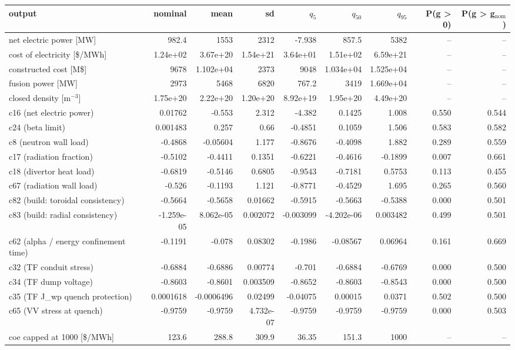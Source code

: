 \begin{tabular}{lrrrrrrrr}
\toprule
output & nominal & mean & sd & $q_{5}$ & $q_{50}$ & $q_{95}$ & P(g > 0) & P(g > g$_\mathrm{nom}$) \\
\midrule
net electric power [MW] & 982.4 & 1553 & 2312 & -7.938 & 857.5 & 5382 & -- & -- \\
cost of electricity [\$/MWh] & 1.24e+02 & 3.67e+20 & 1.54e+21 & 3.64e+01 & 1.51e+02 & 6.59e+21 & -- & -- \\
constructed cost [M\$] & 9678 & 1.102e+04 & 2373 & 9048 & 1.034e+04 & 1.525e+04 & -- & -- \\
fusion power [MW] & 2973 & 5468 & 6820 & 767.2 & 3419 & 1.669e+04 & -- & -- \\
closed density [m$^{-3}$] & 1.75e+20 & 2.22e+20 & 1.20e+20 & 8.92e+19 & 1.95e+20 & 4.49e+20 & -- & -- \\
c16 (net electric power) & 0.01762 & -0.553 & 2.312 & -4.382 & 0.1425 & 1.008 & 0.550 & 0.544 \\
c24 (beta limit) & 0.001483 & 0.257 & 0.66 & -0.4851 & 0.1059 & 1.506 & 0.583 & 0.582 \\
c8 (neutron wall load) & -0.4868 & -0.05604 & 1.177 & -0.8676 & -0.4098 & 1.882 & 0.289 & 0.559 \\
c17 (radiation fraction) & -0.5102 & -0.4411 & 0.1351 & -0.6221 & -0.4616 & -0.1899 & 0.007 & 0.661 \\
c18 (divertor heat load) & -0.6819 & -0.5146 & 0.6805 & -0.9543 & -0.7181 & 0.5753 & 0.113 & 0.455 \\
c67 (radiation wall load) & -0.526 & -0.1193 & 1.121 & -0.8771 & -0.4529 & 1.695 & 0.265 & 0.560 \\
c82 (build: toroidal consistency) & -0.5664 & -0.5658 & 0.01662 & -0.5915 & -0.5663 & -0.5388 & 0.000 & 0.501 \\
c83 (build: radial consistency) & -1.259e-05 & 8.062e-05 & 0.002072 & -0.003099 & -4.202e-06 & 0.003482 & 0.499 & 0.501 \\
c62 (alpha / energy confinement time) & -0.1191 & -0.078 & 0.08302 & -0.1986 & -0.08567 & 0.06964 & 0.161 & 0.669 \\
c32 (TF conduit stress) & -0.6884 & -0.6886 & 0.00774 & -0.701 & -0.6884 & -0.6769 & 0.000 & 0.500 \\
c34 (TF dump voltage) & -0.8603 & -0.8601 & 0.003509 & -0.8652 & -0.8603 & -0.8543 & 0.000 & 0.500 \\
c35 (TF J\_wp quench protection) & 0.0001618 & -0.0006496 & 0.02499 & -0.04075 & 0.00015 & 0.0371 & 0.502 & 0.500 \\
c65 (VV stress at quench) & -0.9759 & -0.9759 & 4.732e-07 & -0.9759 & -0.9759 & -0.9759 & 0.000 & 0.503 \\
coe capped at 1000 [\$/MWh] & 123.6 & 288.8 & 309.9 & 36.35 & 151.3 & 1000 & -- & -- \\
\bottomrule
\end{tabular}
